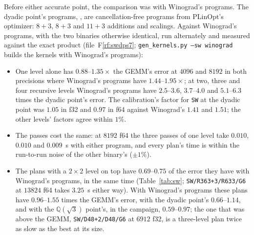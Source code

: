 \documentclass[11pt]{article}
\newcommand{\rf}[1]{F\ref{rf:#1}}
\newcommand{\lv}[1]{\texttt{#1}}
\begin{document}
Before either accurate point, the comparison was with Winograd's programs.
The dyadic point's programs,
, are cancellation-free programs from
PLinOpt's optimizer: $8+3$, $8+3$ and $11+3$ additions and scalings.  Against
Winograd's programs, with the two binaries otherwise identical, run
alternately and measured against the exact product
(file~\rf{swdps7}; \texttt{gen\_kernels.py --sw
winograd} builds the kernels with Winograd's programs):
\begin{itemize}
\item One level alone has $0.88$--$1.35\times$ the GEMM's error at $4096$ and
  $8192$ in both precisions where Winograd's programs have $1.44$--$1.95\times$;
  at two, three and four recursive levels Winograd's programs have $2.5$--$3.6$, $3.7$--$4.0$ and $5.1$--$6.3$ times the dyadic point's error.  The
  calibration's factor for \lv{SW} at the dyadic point was $1.05$ in f32 and $0.97$ in f64 against
  Winograd's $1.41$ and $1.51$; the other levels' factors
  agree within $1\%$.
\item The passes cost the same: at $8192$ f64 the three passes of one level take
  $0.010$, $0.010$ and $0.009$~s with either program, and every plan's time is
  within the run-to-run noise of the other binary's ($\pm1\%$).
\item The plans with a $2\times2$ level on top have $0.69$--$0.75$ of the
  error they have with Winograd's programs, in the same time
  (Table~\ref{tab:sw}; \lv{SW/R363+3/R633/G6} at $13824$ f64 takes $3.25$~s
  either way).  With Winograd's programs these plans have $0.96$--$1.55$
  times the GEMM's error, with the dyadic point's $0.66$--$1.14$, and with
  the $\mathbb{Q}(\sqrt3)$ point's, in the campaign, $0.59$--$0.97$; the one
  that was above the GEMM, \lv{SW/D48+2/D48/G6} at $6912$ f32, is a three-level plan
  twice as slow as the best at its size.
\end{itemize}
\end{document}
